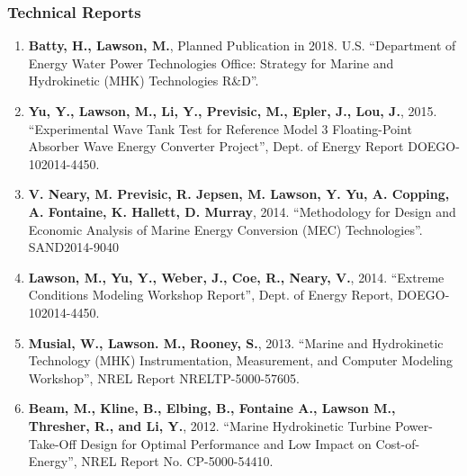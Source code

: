 \subsubsection*{\large{Technical Reports}}
\vspace{-0.15in}

\begin{enumerate}[leftmargin=1.5pc,itemsep=0pt,parsep=0pt,topsep=0pt,partopsep=1pt]

\item \textbf{Batty, H., Lawson, M.}, Planned Publication in 2018. U.S. ``Department of Energy Water Power Technologies Office: Strategy for Marine and Hydrokinetic (MHK) Technologies R\&D''.

\item \textbf{Yu, Y., Lawson, M., Li, Y., Previsic, M., Epler, J., Lou, J.}, 2015. ``Experimental Wave Tank Test for Reference Model 3 Floating-Point Absorber Wave Energy Converter Project'', Dept. of Energy Report DOE\/GO-102014-4450.

\item \textbf{V. Neary, M. Previsic, R. Jepsen, M. Lawson, Y. Yu, A. Copping, A. Fontaine, K. Hallett, D. Murray}, 2014. ``Methodology for Design and Economic Analysis of Marine Energy Conversion (MEC) Technologies''. SAND2014-9040

\item \textbf{Lawson, M., Yu, Y., Weber, J., Coe, R., Neary, V.}, 2014. ``Extreme Conditions Modeling Workshop Report'', Dept. of Energy Report, DOE\/GO-102014-4450.

\item \textbf{Musial, W., Lawson. M., Rooney, S.}, 2013. ``Marine and Hydrokinetic Technology (MHK) Instrumentation, Measurement, and Computer Modeling Workshop'', NREL Report NREL\/TP-5000-57605.

\item \textbf{Beam, M., Kline, B., Elbing, B., Fontaine A., Lawson M., Thresher, R., and Li, Y.}, 2012. ``Marine Hydrokinetic Turbine Power-Take-Off Design for Optimal Performance and Low Impact on Cost-of-Energy'', NREL Report No. CP-5000-54410.

\end{enumerate}

